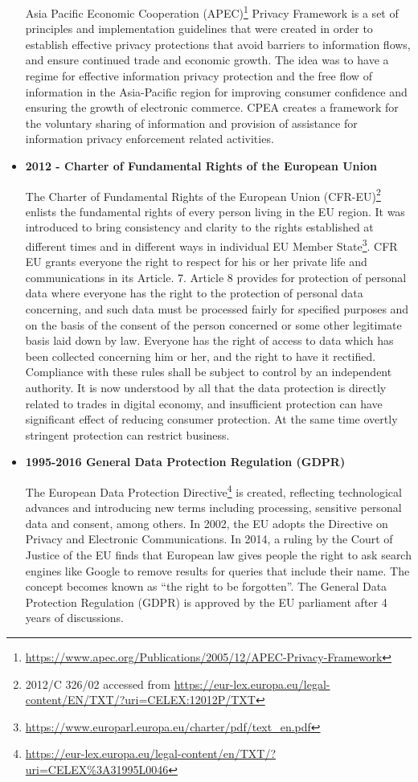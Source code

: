 \begin{multicols}{2}
\begin{itemize}
Asia Pacific Economic Cooperation (APEC)\footnote{\url{https://www.apec.org/Publications/2005/12/APEC-Privacy-Framework}} Privacy Framework is a set of principles and implementation guidelines that were created in order to establish effective privacy protections that avoid barriers to information flows, and ensure continued trade and economic growth. The idea was to have a regime for effective information privacy protection and the free flow of information in the Asia-Pacific region for improving consumer confidence and ensuring the growth of electronic commerce. CPEA creates a framework for the voluntary sharing of information and provision of assistance for information privacy enforcement related activities. 

\item[{\bf 4.}]\textbf{2012 - Charter of Fundamental Rights of the European Union}

The Charter of Fundamental Rights of the European Union (CFR-EU)\footnote{2012/C 326/02 accessed from \url{ https://eur-lex.europa.eu/legal-content/EN/TXT/?uri=CELEX:12012P/TXT}} enlists the fundamental rights of every person living in the EU region. It was introduced to bring consistency and clarity to the rights established at different times and in different ways in individual EU Member State\footnote{\url{https://www.europarl.europa.eu/charter/pdf/text\_en.pdf}}. CFR EU grants everyone the right to respect for his or her private life and communications in its Article. 7. Article 8 provides for protection of personal data where everyone has the right to the protection of personal data concerning, and such data must be processed fairly for specified purposes and on the basis of the consent of the person concerned or some other legitimate basis laid down by law. Everyone has the right of access to data which has been collected concerning him or her, and the right to have it rectified. Compliance with these rules shall be subject to control by an independent authority. It is now understood by all that the data protection is directly related to trades in digital economy, and insufficient protection can have significant effect of reducing consumer protection. At the same time overtly stringent protection can restrict business.

\item[{\bf 5.}]\textbf{1995-2016 General Data Protection Regulation (GDPR)}

The European Data Protection Directive\footnote{\url{https://eur-lex.europa.eu/legal-content/en/TXT/?uri=CELEX\%3A31995L0046}} is created, reflecting technological advances and introducing new terms including processing, sensitive personal data and consent, among others. In 2002, the EU adopts the Directive on Privacy and Electronic Communications. In 2014, a ruling by the Court of Justice of the EU finds that European law gives people the right to ask search engines like Google to remove results for queries that include their name. The concept becomes known as “the right to be forgotten”. The General Data Protection Regulation (GDPR) is approved by the EU parliament after 4 years of discussions.
\end{itemize}


\end{multicols}
